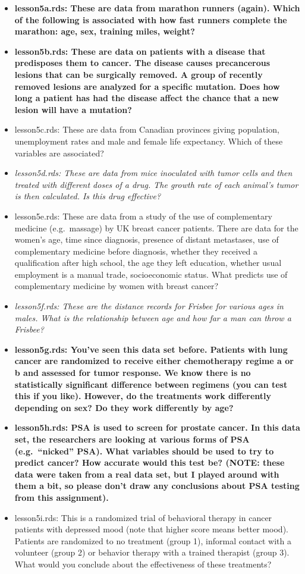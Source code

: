 \documentclass[]{book}
\begin{document}
\begin{itemize}
\item
  \textbf{lesson5a.rds: These are data from marathon runners (again).
  Which of the following is associated with how fast runners complete
  the marathon: age, sex, training miles, weight?}
\item
  \textbf{lesson5b.rds: These are data on patients with a disease that
  predisposes them to cancer. The disease causes precancerous lesions
  that can be surgically removed. A group of recently removed lesions
  are analyzed for a specific mutation. Does how long a patient has had
  the disease affect the chance that a new lesion will have a mutation?}
\item
  lesson5c.rds: These are data from Canadian provinces giving
  population, unemployment rates and male and female life expectancy.
  Which of these variables are associated?
\item
  \emph{lesson5d.rds: These are data from mice inoculated with tumor
  cells and then treated with different doses of a drug. The growth rate
  of each animal's tumor is then calculated. Is this drug effective?}
\item
  lesson5e.rds: These are data from a study of the use of complementary
  medicine (e.g.~massage) by UK breast cancer patients. There are data
  for the women's age, time since diagnosis, presence of distant
  metastases, use of complementary medicine before diagnosis, whether
  they received a qualification after high school, the age they left
  education, whether usual employment is a manual trade, socioeconomic
  status. What predicts use of complementary medicine by women with
  breast cancer?
\item
  \emph{lesson5f.rds: These are the distance records for Frisbee for
  various ages in males. What is the relationship between age and how
  far a man can throw a Frisbee?}
\item
  \textbf{lesson5g.rds: You've seen this data set before. Patients with
  lung cancer are randomized to receive either chemotherapy regime a or
  b and assessed for tumor response. We know there is no statistically
  significant difference between regimens (you can test this if you
  like). However, do the treatments work differently depending on sex?
  Do they work differently by age?}
\item
  \textbf{lesson5h.rds: PSA is used to screen for prostate cancer. In
  this data set, the researchers are looking at various forms of PSA
  (e.g.~``nicked'' PSA). What variables should be used to try to predict
  cancer? How accurate would this test be? (NOTE: these data were taken
  from a real data set, but I played around with them a bit, so please
  don't draw any conclusions about PSA testing from this assignment).}
\item
  lesson5i.rds: This is a randomized trial of behavioral therapy in
  cancer patients with depressed mood (note that higher score means
  better mood). Patients are randomized to no treatment (group 1),
  informal contact with a volunteer (group 2) or behavior therapy with a
  trained therapist (group 3). What would you conclude about the
  effectiveness of these treatments?
\end{itemize}
\end{document}
